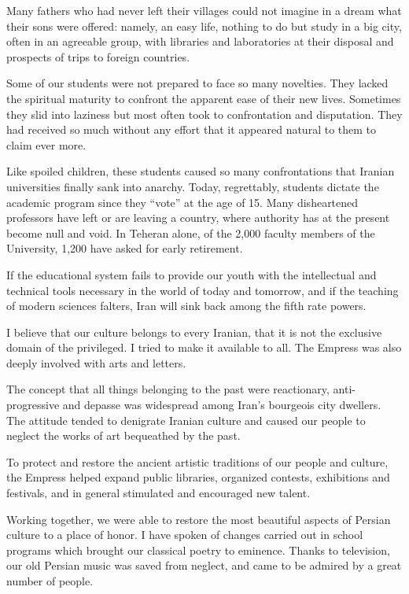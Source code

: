 Many fathers who had never left their villages could not imagine in a dream what their sons were offered: namely, an easy life, nothing to do but study in a big city, often in an agreeable group, with libraries and laboratories at their disposal and prospects of trips to foreign countries. 

Some of our students were not prepared to face so many novelties. They lacked the spiritual maturity to confront the apparent ease of their new lives. Sometimes they slid into laziness but most often took to confrontation and disputation. They had received so much without any effort that it appeared natural to them to claim ever more. 

Like spoiled children, these students caused so many confrontations that Iranian universities finally sank into anarchy. Today, regrettably, students dictate the academic program since they “vote” at the age of 15. Many disheartened professors have left or are leaving a country, where authority has at the present become null and void. In Teheran alone, of the 2,000 faculty members of the University, 1,200 have asked for early retirement. 

If the educational system fails to provide our youth with the intellectual and technical tools necessary in the world of today and tomorrow, and if the teaching of modern sciences falters, Iran will sink back among the fifth rate powers. 


I believe that our culture belongs to every Iranian, that it is not the exclusive domain of the privileged. I tried to make it available to all. The Empress was also deeply involved with arts and letters. 

The concept that all things belonging to the past were reactionary, anti-progressive and depasse was widespread among Iran's bourgeois city dwellers. The attitude tended to denigrate Iranian culture and caused our people to neglect the works of art bequeathed by the past. 

To protect and restore the ancient artistic traditions of our people and culture, the Empress helped expand public libraries, organized contests, exhibitions and festivals, and in general stimulated and encouraged new talent. 

Working together, we were able to restore the most beautiful aspects of Persian culture to a place of honor. I have spoken of changes carried out in school programs which brought our classical poetry to eminence. Thanks to television, our old Persian music was saved from neglect, and came to be admired by a great number of people. 

